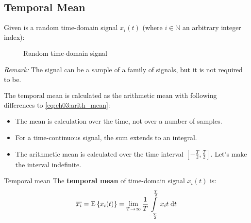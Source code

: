 \begin{refsection}
\subsection{Temporal Mean}

Given is a random time-domain signal $x_i(t)$ (where $i \in \mathbb{N}$ an arbitrary integer index):

\begin{figure}[H]
	\centering
	\caption{Random time-domain signal}
\end{figure}

\textit{Remark:} The signal can be a sample of a family of signals, but it is not required to be.

The temporal mean is calculated as the arithmetic mean with following differences to \eqref{eq:ch03:arith_mean}:
\begin{itemize}
	\item The mean is calculation over the time, not over a number of samples.
	\item For a time-continuous signal, the sum extends to an integral.
	\item The arithmetic mean is calculated over the time interval $[-\frac{T}{2}, \frac{T}{2}]$. Let's make the interval indefinite.
\end{itemize}

\begin{definition}{Temporal mean}
	The  \textbf{temporal mean} of time-domain signal $x_i(t)$ is:
	\begin{equation}
		\overline{x_i} = \mathrm{E}\left\{x_i(t)\right\} = \lim\limits_{T \rightarrow \infty} \frac{1}{T} \int\limits_{-\frac{T}{2}}^{\frac{T}{2}} x_i{t} \; \mathrm{d} t
	\end{equation}%
\end{definition}


\end{refsection}
